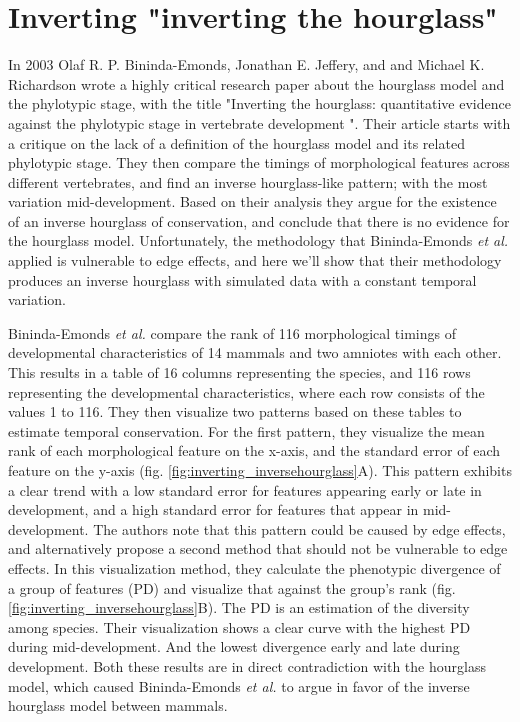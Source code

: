 \chapter{Inverting "inverting the hourglass"}\thumbforchapter
\newpage

In 2003 Olaf R. P. Bininda-Emonds, Jonathan E. Jeffery, and and Michael K. Richardson wrote a highly critical research paper about the hourglass model and the phylotypic stage, with the title "Inverting the hourglass: quantitative evidence against the phylotypic stage in vertebrate development "\cite{OlafRP2003}. Their article starts with a critique on the lack of a definition of the hourglass model and its related phylotypic stage. They then compare the timings of morphological features across different vertebrates, and find an inverse hourglass-like pattern; with the most variation mid-development. Based on their analysis they argue for the existence of an inverse hourglass of conservation, and conclude that there is no evidence for the hourglass model. Unfortunately, the methodology that Bininda-Emonds \textit{et al.} applied is vulnerable to edge effects, and here we'll show that their methodology produces an inverse hourglass with simulated data with a constant temporal variation.

Bininda-Emonds \textit{et al.} compare the rank of 116 morphological timings of developmental characteristics of 14 mammals and two amniotes with each other. This results in a table of 16 columns representing the species, and 116 rows representing the developmental characteristics, where each row consists of the values 1 to 116. They then visualize two patterns based on these tables to estimate temporal conservation. For the first pattern, they visualize the mean rank of each morphological feature on the x-axis, and the standard error of each feature on the y-axis (fig. \ref{fig:inverting_inversehourglass}A). This pattern exhibits a clear trend with a low standard error for features appearing early or late in development, and a high standard error for features that appear in mid-development. The authors note that this pattern could be caused by edge effects, and alternatively propose a second method that should not be vulnerable to edge effects. In this visualization method, they calculate the phenotypic divergence of a group of features (PD) and visualize that against the group's rank (fig. \ref{fig:inverting_inversehourglass}B). The PD is an estimation of the diversity among species. Their visualization shows a clear curve with the highest PD during mid-development. And the lowest divergence early and late during development. Both these results are in direct contradiction with the hourglass model, which caused Bininda-Emonds \textit{et al.} to argue in favor of the inverse hourglass model between mammals.

